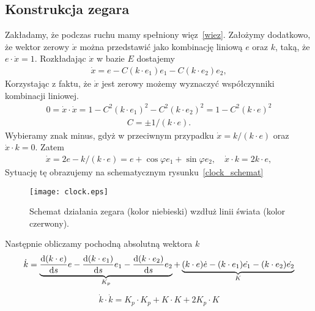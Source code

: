 \subsection{Konstrukcja zegara}


Zakładamy, że podczas ruchu mamy spełniony więz~\eqref{wiez}.
Założymy dodatkowo, że wektor zerowy $\dot{x}$ można przedstawić
jako kombinację liniową $e$ oraz $k$, taką, że $e\cdot \dot{x} = 1$.
Rozkładając $\dot{x}$ w bazie $E$ dostajemy
\begin{align*}
\dot{x} = e - C (k\cdot e_1) e_1 - C (k\cdot e_2)e_2,
\end{align*}
Korzystając z faktu, że $\dot{x}$ jest zerowy możemy wyznaczyć
współczynniki kombinacji liniowej.
\begin{align*}
0 = \dot{x} \cdot \dot{x} = 1 - C^2 (k\cdot e_1)^2 - C^2 (k\cdot e_2)^2
= 1 - C^2 (k\cdot e)^2
\end{align*}
\begin{align*}
C= \pm 1/(k\cdot e).
\end{align*}
Wybieramy znak minus, gdyż w przeciwnym przypadku
$\dot{x} = k / (k\cdot e)$ oraz $\dot{x}\cdot k = 0$. Zatem
\begin{align}
\boxed{\dot{x} = 2 e - k / (k\cdot e) = 
e + \cos \varphi e_1 + \sin\varphi e_2
,\quad \dot{x}\cdot k = 2 k \cdot e,   }
\end{align}
Sytuację tę obrazujemy na schematycznym rysunku~\eqref{clock_schemat}
\begin{figure}
\centering
\texttt{[image: clock.eps]}
\caption{Schemat działania zegara (kolor niebieski)
 wzdłuż linii świata (kolor czerwony).}
\label{clock_schemat}
\end{figure}


Następnie obliczamy pochodną absolutną wektora $k$
\begin{align*}
\dot{k} =\underbrace{ \frac{\text{d} (k\cdot e)}{\text{d} s} e - 
\frac{\text{d} (k\cdot e_1)}{\text{d} s}e_1 -
\frac{\text{d} (k\cdot e_2)}{\text{d} s}e_2}_{K_p}
+\underbrace{(k\cdot e)\dot{e} - (k\cdot e_1)\dot{e_1} 
-(k\cdot e_2)\dot{e_2} }_{K}
\end{align*}
\begin{align*}
\dot{k}\cdot\dot{k} = K_p\cdot K_p + K\cdot K + 2K_p\cdot K
\end{align*}

